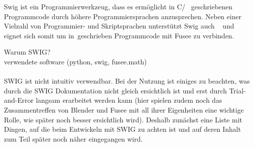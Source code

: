 \label{sec:Umsetzung}


Swig ist ein Programmierwerkzeug, dass es ermöglicht in C/\CC~ geschriebenen Programmcode durch höhere Programmiersprachen anzusprechen. Neben einer Vielzahl von Programmier- und Skriptsprachen unterstützt Swig auch \CS~ und eignet sich somit um in\CC~geschrieben Programmcode mit Fusee zu verbinden.

Warum SWIG?\\
verwendete software (python, swig, fusee.math)\\\\

SWIG ist nicht intuitiv verwendbar. Bei der Nutzung ist einiges zu beachten, was durch die SWIG Dokumentation nicht gleich ersichtlich ist und erst durch Trial-and-Error langsam erarbeitet werden kann (hier spielen zudem noch das Zusammentreffen von Blender und Fusee mit all ihrer Eigenheiten eine wichtige Rolle, wie später noch besser ersichtlich wird). Deshalb zunächst eine Liste mit Dingen, auf die beim Entwickeln mit SWIG zu achten ist und auf deren Inhalt zum Teil später noch näher eingegangen wird.

